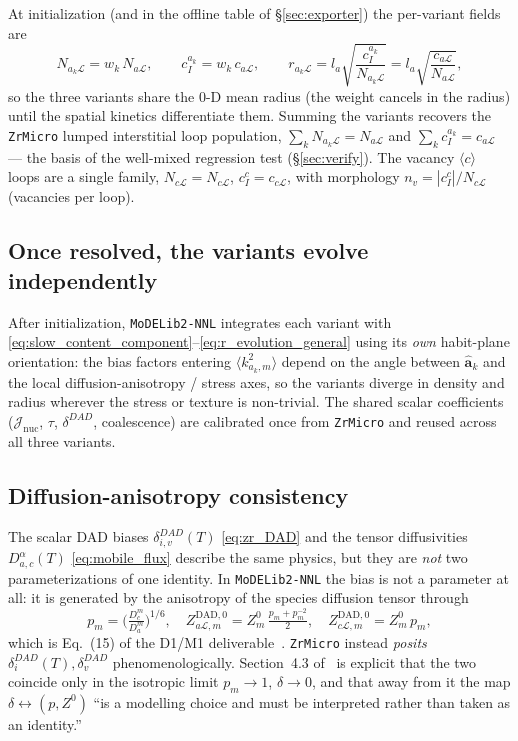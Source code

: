 \documentclass[11pt]{article}
\newcommand{\Lcal}{\mathcal{L}}
\newcommand{\ZrMicro}{\texttt{ZrMicro}}
\newcommand{\MoDELib}{\texttt{MoDELib2-NNL}}
\begin{document}
At initialization (and in the offline table of \S\ref{sec:exporter}) the per-variant
fields are
\begin{equation}
\label{eq:variant_split}
    N_{a_k\Lcal} = w_k\,N_{a\Lcal},
    \qquad
    c^{a_k}_I = w_k\,c_{a\Lcal},
    \qquad
    r_{a_k\Lcal} = l_a\sqrt{\frac{c^{a_k}_I}{N_{a_k\Lcal}}} = l_a\sqrt{\frac{c_{a\Lcal}}{N_{a\Lcal}}},
\end{equation}
so the three variants share the 0-D mean radius (the weight cancels in the
radius) until the spatial kinetics differentiate them. Summing the variants
recovers the \ZrMicro{} lumped interstitial loop population,
$\sum_k N_{a_k\Lcal}=N_{a\Lcal}$ and $\sum_k c^{a_k}_I=c_{a\Lcal}$ --- the basis of
the well-mixed regression test (\S\ref{sec:verify}). The vacancy
$\langle c\rangle$ loops are a single family, $N_{c\Lcal}=N_{c\Lcal}$,
$c^{c}_I=c_{c\Lcal}$, with morphology $n_v=|c^{c}_I|/N_{c\Lcal}$ (vacancies per
loop).

\subsection{Once resolved, the variants evolve independently}

After initialization, \MoDELib{} integrates each variant with
\eqref{eq:slow_content_component}--\eqref{eq:r_evolution_general} using its
\emph{own} habit-plane orientation: the bias factors entering
$\langle k^2_{a_k,m}\rangle$ depend on the angle between $\hat{\mathbf a}_k$ and
the local diffusion-anisotropy / stress axes, so the variants diverge in density
and radius wherever the stress or texture is non-trivial. The shared scalar
coefficients ($\mathcal J_{\mathrm{nuc}}$, $\tau$, $\delta^{DAD}$, coalescence)
are calibrated once from \ZrMicro{} and reused across all three variants.

\subsection{Diffusion-anisotropy consistency}
\label{sec:dad}

The scalar DAD biases $\delta^{DAD}_{i,v}(T)$ \eqref{eq:zr_DAD} and the tensor
diffusivities $D^\alpha_{a,c}(T)$ \eqref{eq:mobile_flux} describe the same
physics, but they are \emph{not} two parameterizations of one identity. In
\MoDELib{} the bias is not a parameter at all: it is generated by the
anisotropy of the species diffusion tensor through
\begin{equation}
\label{eq:pm_dad}
    p_m=\Big(\tfrac{D_c^m}{D_a^m}\Big)^{1/6},
    \quad
    Z_{a\Lcal,m}^{\mathrm{DAD},0}=Z_m^0\,\tfrac{p_m+p_m^{-2}}{2},
    \quad
    Z_{c\Lcal,m}^{\mathrm{DAD},0}=Z_m^0\,p_m,
\end{equation}
which is Eq.~(15) of the D1/M1 deliverable~\cite{PoGhoniem2026D1M1}. \ZrMicro{}
instead \emph{posits} $\delta^{DAD}_{i}(T),\delta^{DAD}_{v}$ phenomenologically.
Section~4.3 of~\cite{PoGhoniem2026D1M1} is explicit that the two coincide only in
the isotropic limit $p_m\to1$, $\delta\to0$, and that away from it the map
$\delta\leftrightarrow(p,Z^0)$ ``is a modelling choice and must be interpreted
rather than taken as an identity.''
\end{document}
